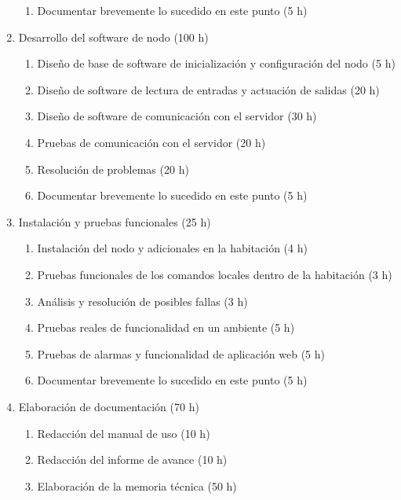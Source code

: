 \documentclass[
11pt, %
]{charter}
\begin{document}
\begin{enumerate}
\begin{enumerate}
		\item Documentar brevemente lo sucedido en este punto (5 h)
	\end{enumerate}
\item Desarrollo del software de nodo (100 h)
	\begin{enumerate}
		\item Diseño de base de software de inicialización y configuración del nodo (5 h)
		\item Diseño de software de lectura de entradas y actuación de salidas (20 h)
		\item Diseño de software de comunicación con el servidor (30 h)
		\item Pruebas de comunicación con el servidor (20 h)
		\item Resolución de problemas (20 h)
		\item Documentar brevemente lo sucedido en este punto (5 h)
	\end{enumerate}
\item Instalación y pruebas funcionales (25 h)
	\begin{enumerate}
		\item Instalación del nodo y adicionales en la habitación (4 h)
		\item Pruebas funcionales de los comandos locales dentro de la habitación (3 h)
		\item Análisis y resolución de posibles fallas (3 h)
		\item Pruebas reales de funcionalidad en un ambiente (5 h)
		\item Pruebas de alarmas y funcionalidad de aplicación web (5 h)
		\item Documentar brevemente lo sucedido en este punto (5 h)
	\end{enumerate}
\item Elaboración de documentación (70 h)
	\begin{enumerate}
		\item Redacción del manual de uso (10 h)
		\item Redacción del informe de avance (10 h)
		\item Elaboración de la memoria técnica (50 h)
	\end{enumerate}
\end{enumerate}
\end{document}
